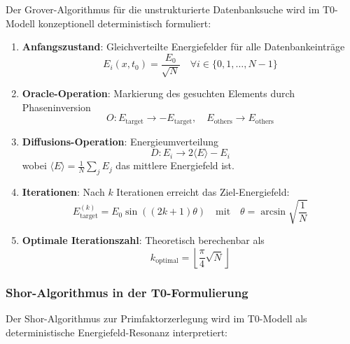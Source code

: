 \documentclass[12pt,a4paper]{article}
\theoremstyle{definition}
\begin{document}
	Der Grover-Algorithmus für die unstrukturierte Datenbanksuche wird im T0-Modell konzeptionell deterministisch formuliert:
	
	\begin{enumerate}
		\item \textbf{Anfangszustand}: Gleichverteilte Energiefelder für alle Datenbankeinträge
		\begin{equation}
			E_i(x,t_0) = \frac{E_0}{\sqrt{N}} \quad \forall i \in \{0,1,\ldots,N-1\}
		\end{equation}
		
		\item \textbf{Oracle-Operation}: Markierung des gesuchten Elements durch Phaseninversion
		\begin{equation}
			O: E_{\text{target}} \rightarrow -E_{\text{target}}, \quad E_{\text{others}} \rightarrow E_{\text{others}}
		\end{equation}
		
		\item \textbf{Diffusions-Operation}: Energieumverteilung
		\begin{equation}
			D: E_i \rightarrow 2\langle E \rangle - E_i
		\end{equation}
		wobei $\langle E \rangle = \frac{1}{N}\sum_j E_j$ das mittlere Energiefeld ist.
		
		\item \textbf{Iterationen}: Nach $k$ Iterationen erreicht das Ziel-Energiefeld:
		\begin{equation}
			E_{\text{target}}^{(k)} = E_0 \sin\left((2k+1)\theta\right) \quad \text{mit} \quad \theta = \arcsin\sqrt{\frac{1}{N}}
		\end{equation}
		
		\item \textbf{Optimale Iterationszahl}: Theoretisch berechenbar als
		\begin{equation}
			k_{\text{optimal}} = \left\lfloor\frac{\pi}{4}\sqrt{N}\right\rfloor
		\end{equation}
	\end{enumerate}
	
	\subsubsection{Shor-Algorithmus in der T0-Formulierung}
	
	Der Shor-Algorithmus zur Primfaktorzerlegung wird im T0-Modell als deterministische Energiefeld-Resonanz interpretiert:
	
\end{document}
